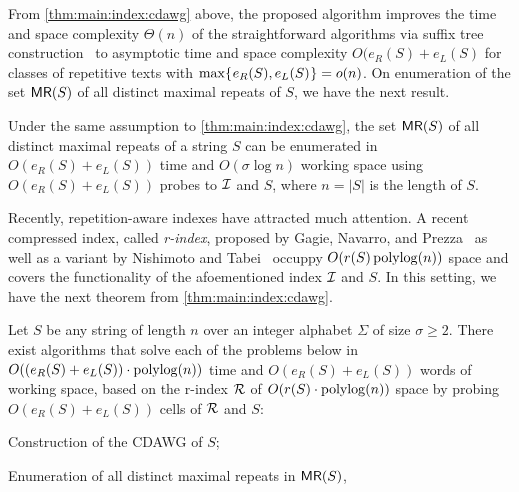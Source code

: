 From \cref{thm:main:index:cdawg} above, the proposed algorithm improves the time and space complexity $\Theta(n)$ of the straightforward algorithms via suffix tree construction~\cite{raffinot2001maximal} to asymptotic time and space complexity $O(e_R(S)+e_L(S)$ for classes of repetitive texts with $\max\{\kern0.05eme_R(S), e_L(S)\kern0.05em\} = o(n)$.
On enumeration of the set $\textsf{MR}(S)$ of all distinct maximal repeats of $S$, we have the next result. 


\begin{theorem}\label{cor:main:index:maxrep}
  Under the same assumption to \cref{thm:main:index:cdawg}, 
  the set $\textsf{MR}(S)$ of all distinct maximal repeats of a string $S$ can be enumerated in $O(e_R(S)+e_L(S))$ time and $O(\sigma \log n)$ working space using $O(e_R(S) + e_L(S))$ probes to $\mathcal{I}$ and $S$, where $n = |S|$ is the length of $S$. 
\end{theorem}

Recently, repetition-aware indexes have attracted much attention. A recent compressed index, called \textit{r-index}, proposed by Gagie, Navarro, and Prezza~\cite{gagie:navarro:prezza2020fully} as well as a variant by Nishimoto and Tabei~\cite{nishimoto2022optimaltime:rlbwt:construction} occuppy $O(r(S)\operatorname{\mathrm{polylog}}(n))$ space and covers the functionality of the afoementioned index $\mathcal{I}$ and $S$. In this setting, we have the next theorem from \cref{thm:main:index:cdawg}. 


\begin{theorem}\label{thm:rindex:all}
  Let $S$ be any string of length $n$ over an integer alphabet $\Sigma$ of size $\sigma \ge 2$. There exist algorithms that solve each of the problems below in $O((e_R(S) + e_L(S))\cdot \operatorname{\mathrm{polylog}}(n))$ time and 
  $O(e_R(S) + e_L(S))$ words of working space,
  based on the r-index $\mathcal{R}$  of $O(r(S)\cdot\operatorname{\mathrm{polylog}}(n))$ space
  by probing $O(e_R(S) + e_L(S))$ cells of $\mathcal{R}$ and $S$: 
\begin{enumerate*}[(1)]
\item Construction of the CDAWG of $S$; 
\item Enumeration of all distinct maximal repeats in $\textsf{MR}(S)$,  
\end{enumerate*}
\end{theorem}



